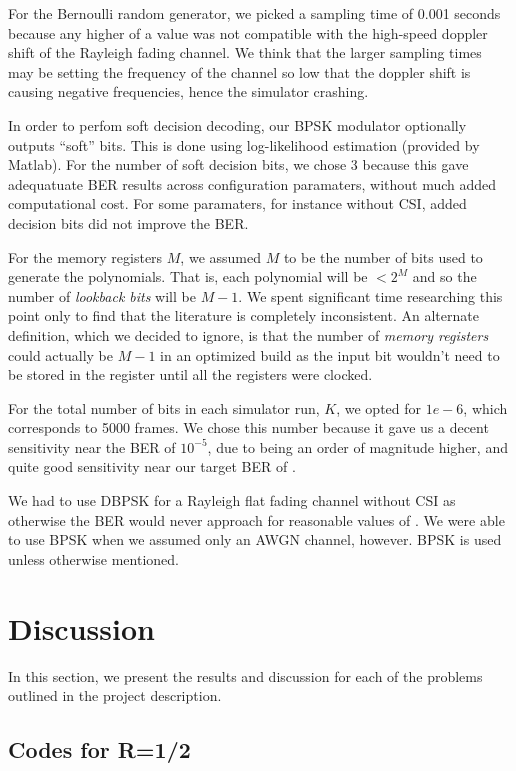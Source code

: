 \documentclass[a4paper,10pt]{article}
\begin{document}
For the Bernoulli random generator, we picked a sampling time of 0.001 seconds because any higher of a value was not compatible with the high-speed doppler shift of the Rayleigh fading channel.
We think that the larger sampling times may be setting the frequency of the channel so low that the doppler shift is causing negative frequencies, hence the simulator crashing.

In order to perfom soft decision decoding, our BPSK modulator optionally outputs ``soft'' bits. This is done using log-likelihood estimation (provided by Matlab). For the number of soft decision bits, we chose 3 because this gave adequatuate BER results across configuration paramaters, without much added computational cost. For some paramaters, for instance without CSI, added decision bits did not improve the BER. 

For the memory registers $M$, we assumed $M$ to be the number of bits used to generate the polynomials.
That is, each polynomial will be $< 2^M$ and so the number of \emph{lookback bits} will be $M-1$.
We spent significant time researching this point only to find that the literature is completely inconsistent.
An alternate definition, which we decided to ignore, is that the number of \emph{memory registers} could actually be $M-1$ in an optimized build as the input bit wouldn't need to be stored in the register until all the registers were clocked.

For the total number of bits in each simulator run, $K$, we opted for $1e-6$, which corresponds to 5000 frames.
We chose this number because it gave us a decent sensitivity near the BER of $10^{-5}$, due to being an order of magnitude higher, and quite good sensitivity near our target BER of \ber.

We had to use DBPSK for a Rayleigh flat fading channel without CSI as otherwise the BER would never approach \ber for reasonable values of \ebno.
We were able to use BPSK when we assumed only an AWGN channel, however. BPSK is used unless otherwise mentioned.

\section{Discussion}

In this section, we present the results and discussion for each of the problems outlined in the project description.

\subsection{Codes for R=1/2}
\end{document}
